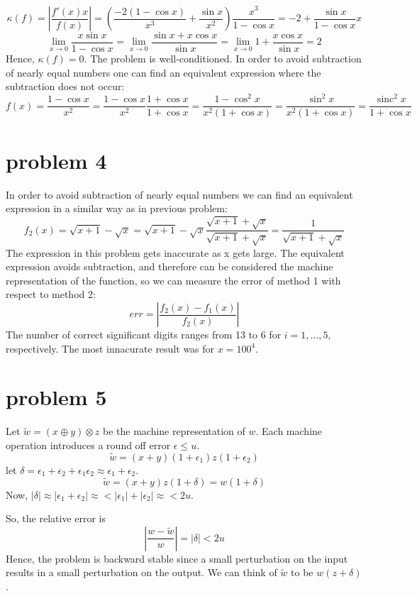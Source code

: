 \documentclass[10pt]{article}
\DeclareMathOperator{\sinc}{sinc}
\begin{document}
  \[
  \kappa(f) = \left|\frac{f'(x) x}{f(x)}\right|=
  \left( \frac{-2(1-\cos x)}{x^3} + \frac{\sin x}{x^2}\right)\frac{x^3}{1-\cos x} =
  -2 + \frac{\sin x}{1-\cos x} x 
  \]
  \[
  \lim_{x \to 0} \frac{x \sin x}{1-\cos x} = \lim_{x \to 0} \frac{\sin x + x\cos x}{\sin x} =
   \lim_{x \to 0} 1 +\frac{x\cos x}{\sin x} = 2
  \]
  Hence, $\kappa(f) = 0$. The problem is well-conditioned.
  In order to avoid subtraction of nearly equal numbers one can
  find an equivalent expression where the subtraction does not occur:
  \[
  f(x) = \frac{1-\cos x}{x^2} = \frac{1-\cos x }{x^2}\frac{1+\cos x}{1+\cos x} = \frac{1-\cos^2 x}{x^2(1+\cos x)} = \frac{\sin^2 x}{x^2(1+\cos x)}=\frac{\sinc^2 x}{1+\cos x}
  \]  

\section{problem 4}
  In order to avoid subtraction of nearly equal numbers we can 
  find an equivalent expression in a similar way as in previous problem:
  \[
  f_2(x) = \sqrt{x+1}-\sqrt{x} = \sqrt{x+1}-\sqrt{x}\frac{\sqrt{x+1}+\sqrt{x}}{\sqrt{x+1}+\sqrt{x}} = \frac{1}{\sqrt{x+1}+\sqrt{x}}
  \]
  The expression in this problem gets inaccurate as x gets large. 
  The equivalent expression avoids subtraction, and therefore can 
  be considered the machine representation of the function, so 
we can measure the error of method 1 with respect to method 2:
   \[
    err = \left |\frac{f_2(x)-f_1(x)}{f_2(x)}\right|
  \]
  The number of correct significant digits ranges
  from 13 to 6 for $i=1,\dots,5$, respectively.
  The most innacurate result was for $x=100^4$.

\section{problem 5}
Let $\widetilde{w}=(x\oplus y)\otimes z$ be the machine
representation of $w$. Each machine operation
introduces a round off error $\epsilon\leq u$.
\[
  \widetilde{w}=(x+y)(1+\epsilon_1)z(1+\epsilon_2)
\]
let $\delta=\epsilon_1+\epsilon_2+\epsilon_1\epsilon_2\approx \epsilon_1+\epsilon_2$.
\[
  \widetilde{w}=(x+y)z(1+\delta)=w(1+\delta)
\]
Now, $|\delta| \approx |\epsilon_1+\epsilon_2| \approx <|\epsilon_1|+|\epsilon_2| \approx < 2u$.

So, the relative error is 
\[
  \left|\frac{w-\widetilde{w}}{w}\right| = |\delta| <2u
\]
Hence, the problem is backward stable since a small perturbation on the
input results in a small perturbation on the output. We can think
of $\widetilde{w}$ to be $w(z+\delta)$.
\end{document}
